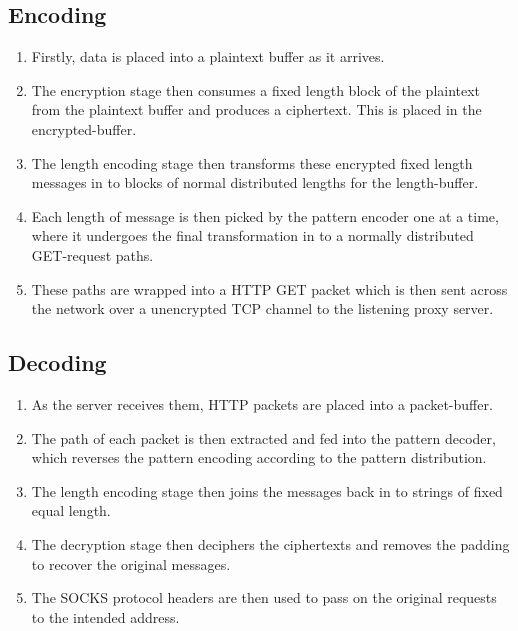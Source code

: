 \documentclass[ %
                    author={Samuel Russell},
                supervisor={Prof. Bogdan Warinschi},
                    degree={MEng},
                     title={Innocuous Ciphertexts},
                  subtitle={The DE-CENSOR Scheme},
                      type={research},
                      year={2018} ]{dissertation}
\begin{document}
\subsection{Encoding}

\begin{enumerate}
\item Firstly, data is placed into a plaintext buffer as it arrives.

\item The encryption stage then consumes a fixed length block of the plaintext from the plaintext buffer and produces a ciphertext.
This is placed in the encrypted-buffer.

\item The length encoding stage then transforms these encrypted fixed length messages in to blocks of normal distributed lengths for the length-buffer.

\item Each length of message is then picked by the pattern encoder one at a time, where it undergoes the final transformation in to a normally distributed GET-request paths. 

\item These paths are wrapped into a HTTP GET packet which is then sent across the network over a unencrypted TCP channel to the listening proxy server.
\end{enumerate}

\subsection{Decoding}

\begin{enumerate}
\item As the server receives them, HTTP packets are placed into a packet-buffer.

\item The path of each packet is then extracted and fed into the pattern decoder, which reverses the pattern encoding according to the pattern distribution.

\item The length encoding stage then joins the messages back in to strings of fixed equal length.

\item The decryption stage then deciphers the ciphertexts and removes the padding to recover the original messages.

\item The SOCKS protocol headers are then used to pass on the original requests to the intended address.

\end{enumerate}
\end{document}
